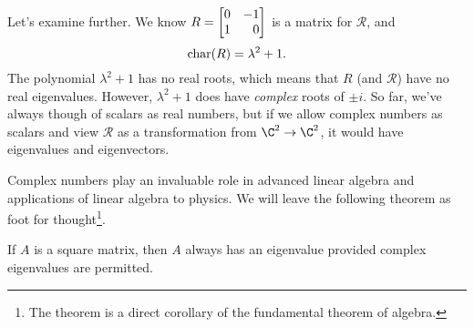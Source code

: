 Let's examine further. We know $R=\mat{0&-1\\1&0}$ is a matrix for $\mathcal R$,
and
\[
	\operatorname{char}(R) = \lambda^2+1.
\]
The polynomial $\lambda^2+1$ has no real roots, which means that $R$ (and $\mathcal R$) have
no real eigenvalues. However, $\lambda^2+1$ does have \emph{complex} roots of $\pm i$.
So far, we've always though of scalars as real numbers, but if we allow complex numbers as
scalars and view $\mathcal R$ as a transformation from $\C^2\to\C^2$, it would have eigenvalues
and eigenvectors.

Complex numbers play an invaluable role in advanced linear algebra and applications of linear
algebra to physics. We will leave the following theorem as foot for thought\footnote{ The theorem
is a direct corollary of the fundamental theorem of algebra.}.

\begin{theorem}
	If $A$ is a square matrix, then $A$ always has an eigenvalue provided complex eigenvalues are permitted.
\end{theorem}
